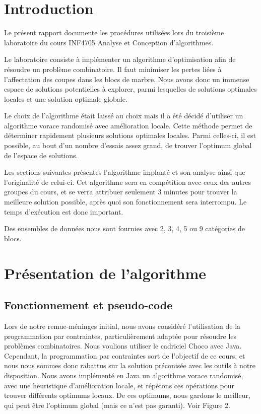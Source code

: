 \documentclass[10pt,a4paper]{article}
\begin{document}
\newpage

\hfill

\newpage

\tableofcontents

\newpage

\section{Introduction}

Le présent rapport documente les procédures utilisées lors du troisième laboratoire du cours INF4705 Analyse et Conception d'algorithmes.

Le laboratoire consiste à implémenter un algorithme d’optimisation afin de résoudre un problème combinatoire. Il faut minimiser les pertes liées à l’affectation des coupes dans les blocs de marbre. Nous avons donc un immense espace de solutions potentielles à explorer, parmi lesquelles de solutions optimales locales et une solution optimale globale.

Le choix de l’algorithme était laissé au choix mais il a été décidé d’utiliser un algorithme vorace randomisé avec amélioration locale. Cette méthode permet de déterminer rapidement plusieurs solutions optimales locales. Parmi celles-ci, il est possible, au bout d'un nombre d'essais assez grand, de trouver l'optimum global de l'espace de solutions.

Les sections suivantes présentes l’algorithme implanté et son analyse ainsi que l’originalité de celui-ci. Cet algorithme sera en compétition avec ceux des autres groupes du cours, et se verra attribuer seulement 3 minutes pour trouver la meilleure solution possible, après quoi son fonctionnement sera interrompu. Le temps d'exécution est donc important.

Des ensembles de données nous sont fournies avec 2, 3, 4, 5 ou 9 catégories de blocs.

\newpage

\section{Présentation de l'algorithme}

\subsection{Fonctionnement et pseudo-code}

Lors de notre remue-méninges initial, nous avons considéré l'utilisation de la programmation par contraintes, particulièrement adaptée pour résoudre les problèmes combinatoires. Nous voulions utiliser le cadriciel Choco avec Java.
Cependant, la programmation par contraintes sort de l'objectif de ce cours, et nous nous sommes donc rabattus sur la solution préconisée avec les outils à notre disposition. Nous avons implémenté en Java un algorithme vorace randomisé, avec une heuristique d'amélioration locale, et répétons ces opérations pour trouver différents optimums locaux. De ces optimums, nous gardons le meilleur, qui peut être l'optimum global (mais ce n'est pas garanti). Voir Figure 2.
\end{document}
